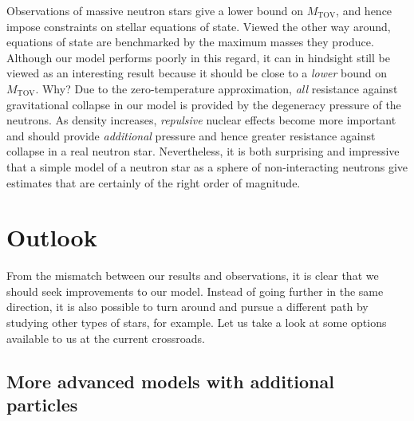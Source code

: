 Observations of massive neutron stars give a lower bound on $M_\text{TOV}$, and hence impose constraints on stellar equations of state.
Viewed the other way around, equations of state are benchmarked by the maximum masses they produce.
Although our model performs poorly in this regard, it can in hindsight still be viewed as an interesting result because it should be close to a \emph{lower} bound on $M_\text{TOV}$.
Why?
Due to the zero-temperature approximation, \emph{all} resistance against gravitational collapse in our model is provided by the degeneracy pressure of the neutrons.
As density increases, \emph{repulsive} nuclear effects become more important and should provide \emph{additional} pressure and hence greater resistance against collapse in a real neutron star. \cite[section 3.9.8]{ref:glendenning}
Nevertheless, it is both surprising and impressive that a simple model of a neutron star as a sphere of non-interacting neutrons give estimates that are certainly of the right order of magnitude.

\section{Outlook}

From the mismatch between our results and observations, it is clear that we should seek improvements to our model.
Instead of going further in the same direction, it is also possible to turn around and pursue a different path by studying other types of stars, for example.
Let us take a look at some options available to us at the current crossroads.

\subsection*{More advanced models with additional particles}

